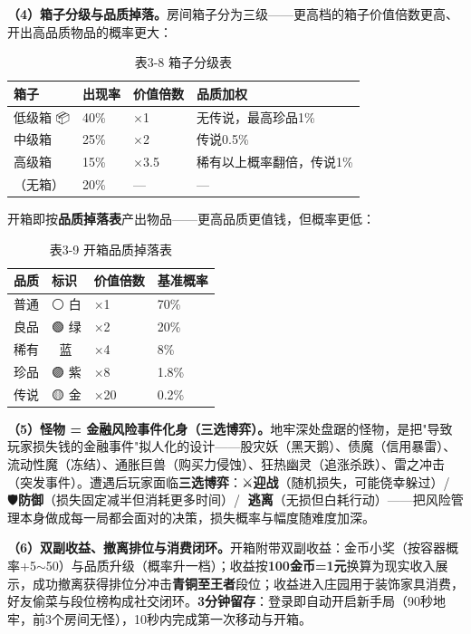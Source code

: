 \documentclass[12pt,a4paper]{ctexart}
\begin{document}
\textbf{（4）箱子分级与品质掉落。}房间箱子分为三级——更高档的箱子价值倍数更高、开出高品质物品的概率更大：

\begin{table}[htbp]
\centering
\begin{tabular}{p{2.6cm}p{2.2cm}p{3.4cm}p{3cm}}
\toprule
\textbf{箱子} & \textbf{出现率} & \textbf{价值倍数} & \textbf{品质加权} \\
\midrule
低级箱 📦 & 40\% & $\times$1 & 无传说，最高珍品1\% \\
中级箱 🧰 & 25\% & $\times$2 & 传说0.5\% \\
高级箱 👑 & 15\% & $\times$3.5 & 稀有以上概率翻倍，传说1\% \\
（无箱） & 20\% & — & — \\
\bottomrule
\end{tabular}
\caption*{表3-8 \quad 箱子分级表}
\end{table}

开箱即按\textbf{品质掉落表}产出物品——更高品质更值钱，但概率更低：

\begin{table}[htbp]
\centering
\begin{tabular}{p{2.2cm}p{2cm}p{2.4cm}p{2.6cm}}
\toprule
\textbf{品质} & \textbf{标识} & \textbf{价值倍数} & \textbf{基准概率} \\
\midrule
普通 & ⚪ 白 & $\times$1 & 70\% \\
良品 & 🟢 绿 & $\times$2 & 20\% \\
稀有 & 🔵 蓝 & $\times$4 & 8\% \\
珍品 & 🟣 紫 & $\times$8 & 1.8\% \\
传说 & 🟡 金 & $\times$20 & 0.2\% \\
\bottomrule
\end{tabular}
\caption*{表3-9 \quad 开箱品质掉落表}
\end{table}

\textbf{（5）怪物 = 金融风险事件化身（三选博弈）。}地牢深处盘踞的怪物，是把"导致玩家损失钱的金融事件"拟人化的设计——股灾妖（黑天鹅）、债魔（信用暴雷）、流动性魔（冻结）、通胀巨兽（购买力侵蚀）、狂热幽灵（追涨杀跌）、雷之冲击（突发事件）。遭遇后玩家面临\textbf{三选博弈}：⚔️\textbf{迎战}（随机损失，可能侥幸躲过）/ 🛡️\textbf{防御}（损失固定减半但消耗更多时间）/ 🏃\textbf{逃离}（无损但白耗行动）——把风险管理本身做成每一局都会面对的决策，损失概率与幅度随难度加深。

\textbf{（6）双副收益、撤离排位与消费闭环。}开箱附带双副收益：金币小奖（按容器概率+5$\sim$50）与品质升级（概率升一档）；收益按\textbf{100金币=1元}换算为现实收入展示，成功撤离获得排位分冲击\textbf{青铜至王者}段位；收益进入庄园用于装饰家具消费，好友偷菜与段位榜构成社交闭环。\textbf{3分钟留存}：登录即自动开启新手局（90秒地牢，前3个房间无怪），10秒内完成第一次移动与开箱。
\end{document}
